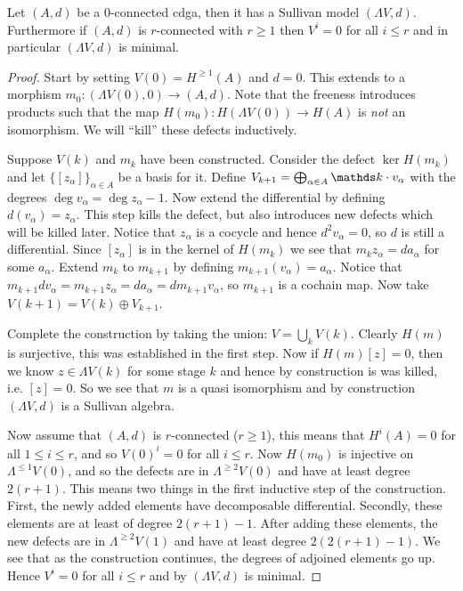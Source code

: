 \begin{theorem}
	Let $(A, d)$ be a $0$-connected cdga, then it has a Sullivan model $(\Lambda V, d)$. Furthermore if $(A, d)$ is $r$-connected with $r \geq 1$ then $V^i = 0$ for all $i \leq r$ and in particular $(\Lambda V, d)$ is minimal.
\end{theorem}
\begin{proof}
	Start by setting $V(0) = H^{\geq 1}(A)$ and $d = 0$. This extends to a morphism $m_0 : (\Lambda V(0), 0) \to (A, d)$.
	Note that the freeness introduces products such that the map $H(m_0) : H(\Lambda V(0)) \to H(A)$ is \emph{not} an isomorphism. We will ``kill'' these defects inductively.

	Suppose $V(k)$ and $m_k$ have been constructed. Consider the defect $\ker H(m_k)$ and let $\{[z_\alpha]\}_{\alpha \in A}$ be a basis for it. Define $V_{k+1} = \bigoplus_{\alpha \in A} \k \cdot v_\alpha$ with the degrees $\deg{v_\alpha} = \deg{z_\alpha}-1$.
	Now extend the differential by defining $d(v_\alpha) = z_\alpha$. This step kills the defect, but also introduces new defects which will be killed later. Notice that $z_\alpha$ is a cocycle and hence $d^2 v_\alpha = 0$, so $d$ is still a differential.
	Since $[z_\alpha]$ is in the kernel of $H(m_k)$ we see that $m_k z_\alpha = d a_\alpha$ for some $a_\alpha$. Extend $m_k$ to $m_{k+1}$ by defining $m_{k+1}(v_\alpha) = a_\alpha$. Notice that $m_{k+1} d v_\alpha = m_{k+1} z_\alpha = d a_\alpha = d m_{k+1} v_\alpha$, so $m_{k+1}$ is a cochain map.
	Now take $V(k+1) = V(k) \oplus V_{k+1}$.

	Complete the construction by taking the union: $V = \bigcup_k V(k)$. Clearly $H(m)$ is surjective, this was established in the first step. Now if $H(m)[z] = 0$, then we know $z \in \Lambda V(k)$ for some stage $k$ and hence by construction is was killed, i.e. $[z] = 0$. So we see that $m$ is a quasi isomorphism and by construction $(\Lambda V, d)$ is a Sullivan algebra.

	 Now assume that $(A, d)$ is $r$-connected ($r \geq 1$), this means that $H^i(A) = 0$ for all $1 \leq i \leq r$, and so $V(0)^i = 0$ for all $i \leq r$. Now $H(m_0)$ is injective on $\Lambda^{\leq 1} V(0)$, and so the defects are in $\Lambda^{\geq 2} V(0)$ and have at least degree $2(r+1)$. This means two things in the first inductive step of the construction. First, the newly added elements have decomposable differential. Secondly, these elements are at least of degree $2(r+1) - 1$. After adding these elements, the new defects are in $\Lambda^{\geq 2} V(1)$ and have at least degree $2(2(r+1) - 1)$. We see that as the construction continues, the degrees of adjoined elements go up. Hence $V^i = 0$ for all $i \leq r$ and by  $(\Lambda V, d)$ is minimal.
\end{proof}


